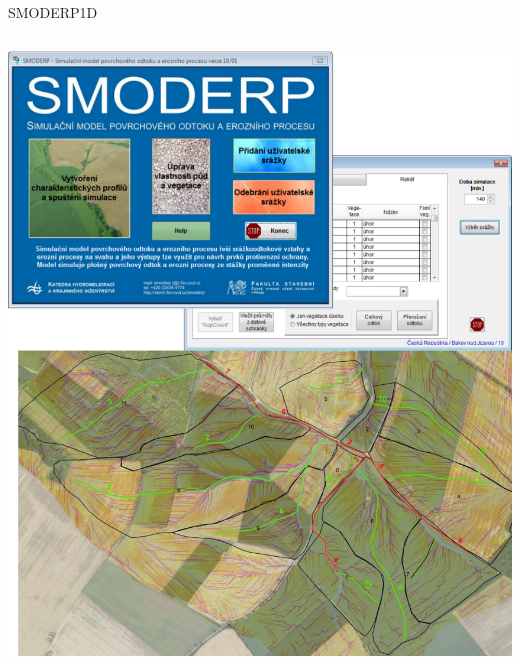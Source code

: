\begin{frame}{SMODERP1D}
\begin{columns}
\begin{column}{0.5\textwidth}
                \includegraphics[width=\textwidth]{obr/smode1d.png}
            \end{column}
        \end{columns}
    \end{frame}


